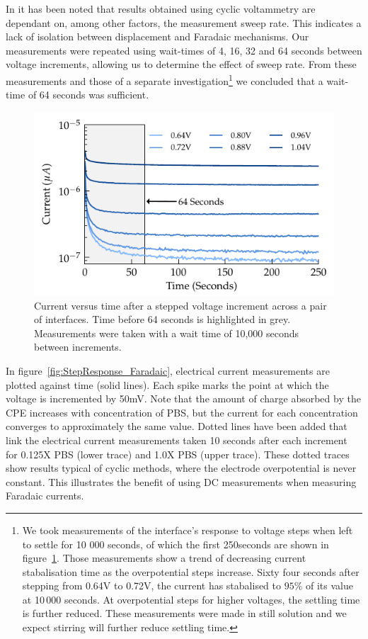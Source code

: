 \documentclass[journal, a4paper]{IEEEtran}
\begin{document}
{In \cite{Cogan2008} it has been noted that results obtained using cyclic voltammetry are dependant on, among other factors, the measurement sweep rate. This indicates a lack of isolation between displacement and Faradaic mechanisms. Our measurements were repeated using wait-times of 4, 16, 32 and 64 seconds between voltage increments, allowing us to determine the effect of sweep rate. From these measurements and those of a separate investigation\footnote{We took measurements of the interface's response to voltage steps when left to settle for 10 000 seconds, of which the first 250\thinspace seconds are shown in figure~\ref{fig:CPE_currentVsTime}. Those measurements show a trend of decreasing current stabalisation time as the overpotential steps increase. Sixty four seconds after stepping from 0.64\thinspace V to 0.72\thinspace V, the current has stabalised to $95\%$ of its value at 10\,000 seconds. At overpotential steps for higher voltages, the settling time is further reduced. These measurements were made in still solution and we expect stirring will further reduce settling time.} we concluded that a wait-time of 64 seconds was sufficient.
\begin{figure}
    \begin{center}
        \includegraphics{graphics/CPE_currentVsTime}
    \end{center}
    \caption{Current versus time after a stepped voltage increment across a pair of interfaces. Time before 64 seconds is highlighted in grey. Measurements were taken with a wait time of 10,000 seconds between increments.}
    \label{fig:CPE_currentVsTime}
\end{figure}

In figure~\ref{fig:StepResponse_Faradaic}, electrical current measurements are plotted against time (solid lines). Each spike marks the point at which the voltage is incremented by 50\thinspace mV. Note that the amount of charge absorbed by the CPE increases with concentration of PBS, but the current for each concentration converges to approximately the same value. Dotted lines have been added that link the electrical current measurements taken 10 seconds after each increment for 0.125X PBS (lower trace) and 1.0X PBS (upper trace). These dotted traces show results typical of cyclic methods, where the electrode overpotential is never constant. This illustrates the benefit of using DC measurements when measuring Faradaic currents.

}
\end{document}
